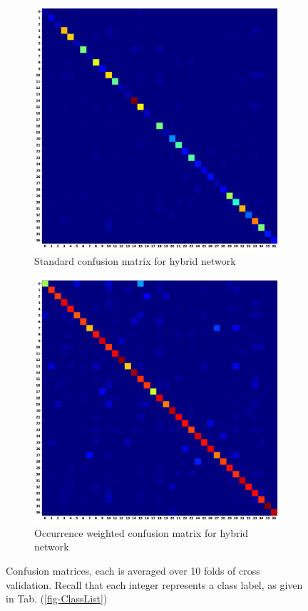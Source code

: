 \documentclass[12pt,letterpaper]{article}
\begin{document}
\begin{figure}[H]
	\begin{subfigure}[b]{0.45\textwidth}
	\centering
	\includegraphics[scale=0.18]{../FiguresMetrics/XValAlphaCLF_Avg_Standard_Confusion}
	\caption{Standard confusion matrix for hybrid network}
	\end{subfigure}
	\hfill
	\begin{subfigure}[b]{0.45\textwidth}
	\centering
	\includegraphics[scale=0.18]{../FiguresMetrics/XValAlphaCLF_Avg_Hits_Weighted_Confusion}
	\caption{Occurrence weighted confusion matrix for hybrid network}
	\end{subfigure}	
	\caption{Confusion matrices, each is averaged over 10 folds of cross validation. Recall that each integer represents a class label, as given in Tab. (\ref{fig-ClassList})}
	\label{fig-MultimodalConfs}
\end{figure}
\end{document}
